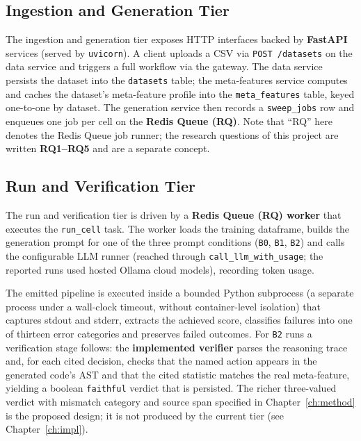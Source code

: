 \subsection{Ingestion and Generation Tier}

The ingestion and generation tier exposes HTTP interfaces backed by
\textbf{FastAPI} services (served by \texttt{uvicorn}). A client
uploads a CSV via \texttt{POST /datasets} on the data service and
triggers a full workflow via the gateway. The data service persists
the dataset into the \texttt{datasets} table; the meta-features
service computes and caches the dataset's meta-feature profile into
the \texttt{meta\_features} table, keyed one-to-one by dataset. The
generation service then records a \texttt{sweep\_jobs} row and
enqueues one job per cell on the \textbf{Redis Queue (RQ)}. Note that
``RQ'' here denotes the Redis Queue job runner; the research
questions of this project are written \textbf{RQ1--RQ5} and are a
separate concept.

\subsection{Run and Verification Tier}

The run and verification tier is driven by a \textbf{Redis Queue (RQ)
worker} that executes the \texttt{run\_cell} task. The worker loads
the training dataframe, builds the generation prompt for one of the
three prompt conditions (\texttt{B0}, \texttt{B1}, \texttt{B2}) and
calls the configurable LLM runner (reached through
\texttt{call\_llm\_with\_usage}; the reported runs used hosted Ollama
cloud models), recording token usage.

The emitted pipeline is executed inside a bounded Python subprocess
(a separate process under a wall-clock timeout, without container-level
isolation) that captures stdout and stderr, extracts the achieved score,
classifies failures into one of thirteen error categories and
preserves failed outcomes. For \texttt{B2} runs a verification stage
follows: the \textbf{implemented verifier} parses the reasoning trace
and, for each cited decision, checks that the named action appears in
the generated code's AST and that the cited statistic matches the
real meta-feature, yielding a boolean \texttt{faithful} verdict that
is persisted. The richer three-valued verdict with mismatch category
and source span specified in Chapter~\ref{ch:method} is the proposed
design; it is not produced by the current tier (see
Chapter~\ref{ch:impl}).


